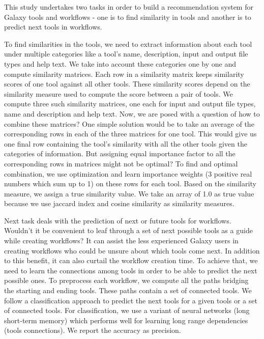 This study undertakes two tasks in order to build a recommendation system for Galaxy tools and workflows - one is to find similarity in tools and another is to predict next tools in workflows.

To find similarities in the tools, we need to extract information about each tool under multiple categories like a tool's name, description, input and output file types and help text. We take into account these categories one by one and compute similarity matrices. Each row in a similarity matrix keeps similarity scores of one tool against all other tools. These similarity scores depend on the similarity measure used to compute the score between a pair of tools. We compute three such similarity matrices, one each for input and output file types, name and description and help text. Now, we are posed with a question of how to combine these matrices? One simple solution would be to take an average of the corresponding rows in each of the three matrices for one tool. This would give us one final row containing the tool's similarity with all the other tools given the categories of information. But assigning equal importance factor to all the corresponding rows in matrices might not be optimal? To find and optimal combination, we use optimization and learn importance weights (3 positive real numbers which sum up to 1) on these rows for each tool. Based on the similarity measure, we assign a true similarity value. We take an array of 1.0 as true value because we use jaccard index and cosine similarity as similarity measures.

Next task deals with the prediction of next or future tools for workflows. Wouldn't it be convenient to leaf through a set of next possible tools as a guide while creating workflows? It can assist the less experienced Galaxy users in creating workflows who could be unsure about which tools come next. In addition to this benefit, it can also curtail the workflow creation time. To achieve that, we need to learn the connections among tools in order to be able to predict the next possible ones. To preprocess each workflow, we compute all the paths bridging the starting and ending tools. These paths contain a set of connected tools. We follow a classification approach to predict the next tools for a given tools or a set of connected tools. For classification, we use a variant of neural networks (long short-term memory) which performs well for learning long range dependencies (tools connections). We report the accuracy as precision.
